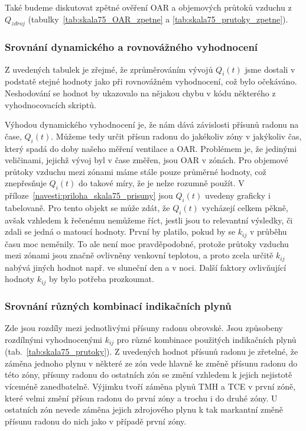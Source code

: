Také budeme diskutovat zpětné ověření OAR a objemových průtoků vzduchu z $Q_{zdroj}$ (tabulky~\ref{tab:skala75_OAR_zpetne} a \ref{tab:skala75_prutoky_zpetne}).

\subsubsection{Srovnání dynamického a rovnovážného vyhodnocení}
Z uvedených tabulek je zřejmé, že zprůměrováním vývojů $Q_i(t)$ jsme dostali v podstatě stejné hodnoty jako při rovnovážném vyhodnocení, což bylo očekáváno. Neshodování se hodnot by ukazovalo na nějakou chybu v kódu některého z vyhodnocovacích skriptů.

Výhodou dynamického vyhodnocení je, že nám dává závislosti přísunů radonu na čase, $Q_i(t)$. Můžeme tedy určit přísun radonu do jakékoliv zóny v jakýkoliv čas, který spadá do doby našeho měření ventilace a OAR. Problémem je, že jedinými veličinami, jejichž vývoj byl v čase změřen, jsou OAR v zónách. Pro objemové průtoky vzduchu mezi zónami máme stále pouze průměrné hodnoty, což znepřesňuje $Q_i(t)$ do takové míry, že je nelze rozumně použít. V příloze~\ref{navesti:priloha_skala75_prisuny} jsou $Q_i(t)$ uvedeny graficky i tabelovaně. Pro tento objekt se může zdát, že $Q_i(t)$ vycházejí celkem pěkně, avšak vzhledem k řečenému nemůžeme říct, jestli jsou to relevantní výsledky, či zdali se jedná o matoucí hodnoty. První by platilo, pokud by se $k_{ij}$
v průběhu času moc neměnily. To ale není moc pravděpodobné, protože průtoky vzduchu mezi zónami jsou značně ovlivněny venkovní teplotou, a proto zcela určitě $k_{ij}$ nabývá jiných hodnot např. ve sluneční den a v noci. Další faktory ovlivňující hodnoty $k_{ij}$ by bylo potřeba prozkoumat.

\subsubsection{Srovnání různých kombinací indikačních plynů}
Zde jsou rozdíly mezi jednotlivými přísuny radonu obrovské. Jsou způsobeny rozdílnými vyhodnocenými $k_{ij}$ pro různé kombinace použitých indikačních plynů (tab.~\ref{tab:skala75_prutoky}). Z uvedených hodnot přísunů radonu je zřetelné, že záměna jednoho plynu v některé ze zón vede hlavně ke změně přísunu radonu do této zóny, přísuny radonu do ostatních zón se změní vzhledem k jejich nejistotě víceméně zanedbatelně. Výjimku tvoří záměna plynů TMH a TCE v první zóně, které velmi změní přísun radonu do první zóny a trochu i do druhé zóny. U ostatních zón nevede záměna jejich zdrojového plynu k tak markantní změně přísunu radonu do nich jako v případě první zóny. 

